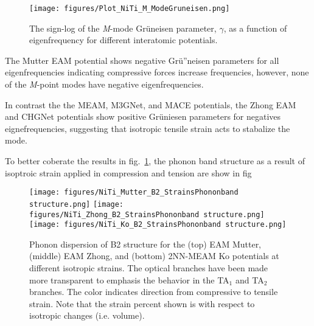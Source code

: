 \documentclass[preprint,colorlinks=true,linkcolor=black,citecolor=black]{elsarticle}
\begin{document}
\begin{figure}[!htp]
	 \centering
	\texttt{[image: figures/Plot\_NiTi\_M\_ModeGruneisen.png]}
	\label{fig:modegruneisen}
	\caption{The sign-log of the \textit{M}-mode Gr\"{u}neisen
	parameter, $\gamma$, as a function of eigenfrequency for different
	interatomic potentials.}
\end{figure}

The Mutter EAM potential shows negative Gr\"{u}''neisen parameters for
all eigenfrequencies indicating compressive forces increase
frequencies, however, none of the \textit{M}-point modes have negative
eigenfrequencies. \par

In contrast the the MEAM, M3GNet, and MACE potentials, the Zhong EAM
and CHGNet potentials show positive Gr\"{u}niesen parameters for
negatives eignefrequencies, suggesting that isotropic tensile strain
acts to stabalize the mode. \par

To better coberate the results in fig.~\ref{fig:modegruneisen}, the
phonon band structure as a result of isoptroic strain applied in
compression and tension are show in fig

\begin{figure}[!htp]
	\begin{centering}
		\texttt{[image: figures/NiTi\_Mutter\_B2\_StrainsPhononband structure.png]}
		\vspace{1mm}
		\texttt{[image: figures/NiTi\_Zhong\_B2\_StrainsPhononband structure.png]}
		\vspace{1mm}
		\texttt{[image: figures/NiTi\_Ko\_B2\_StrainsPhononband structure.png]}
		\caption{ Phonon dispersion of B2 structure for the (top) EAM
			Mutter, (middle) EAM Zhong, and (bottom) 2NN-MEAM Ko potentials
			at different isotropic strains. The optical branches have been
			made more transparent to emphasis the behavior in the TA$_1$ and
			TA$_2$ branches. The color indicates direction from compressive
			to tensile strain. Note that the strain percent shown is with
			respect to isotropic changes (i.e. volume).  }
		\label{fig:mutter_zhong_ko_phonon_b2}
	\end{centering}
\end{figure}

\end{document}
